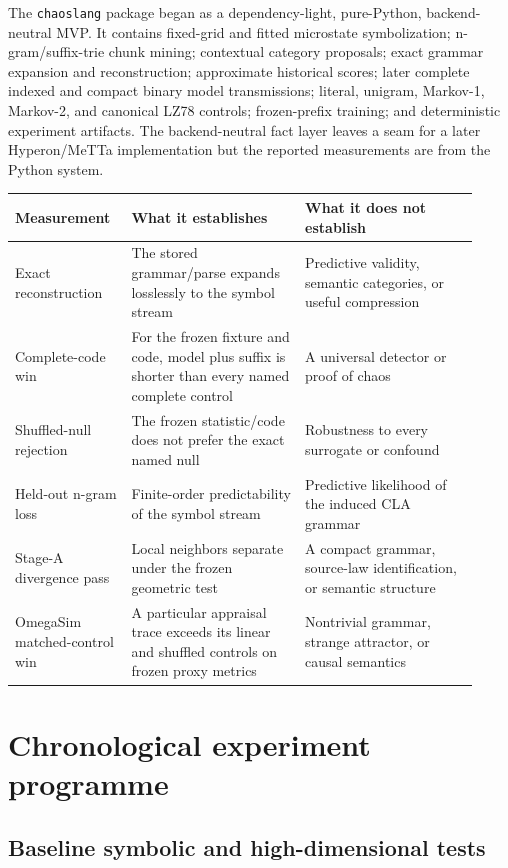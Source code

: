 \documentclass[10pt]{article}
\begin{document}
The \texttt{chaoslang} package began as a dependency-light, pure-Python,
backend-neutral MVP. It contains fixed-grid and fitted microstate
symbolization; n-gram/suffix-trie chunk mining; contextual category proposals;
exact grammar expansion and reconstruction; approximate historical scores;
later complete indexed and compact binary model transmissions; literal,
unigram, Markov-1, Markov-2, and canonical LZ78 controls; frozen-prefix
training; and deterministic experiment artifacts. The backend-neutral fact
layer leaves a seam for a later Hyperon/MeTTa implementation but the reported
measurements are from the Python system.

\begin{longtable}{p{0.22\linewidth}p{0.35\linewidth}p{0.35\linewidth}}
\toprule
Measurement & What it establishes & What it does not establish \\
\midrule
\endhead
Exact reconstruction & The stored grammar/parse expands losslessly to the
symbol stream & Predictive validity, semantic categories, or useful
compression \\
Complete-code win & For the frozen fixture and code, model plus suffix is
shorter than every named complete control & A universal detector or proof of
chaos \\
Shuffled-null rejection & The frozen statistic/code does not prefer the exact
named null & Robustness to every surrogate or confound \\
Held-out n-gram loss & Finite-order predictability of the symbol stream &
Predictive likelihood of the induced CLA grammar \\
Stage-A divergence pass & Local neighbors separate under the frozen geometric
test & A compact grammar, source-law identification, or semantic structure \\
OmegaSim matched-control win & A particular appraisal trace exceeds its
linear and shuffled controls on frozen proxy metrics & Nontrivial grammar,
strange attractor, or causal semantics \\
\bottomrule
\end{longtable}

\section{Chronological experiment programme}

\subsection{Baseline symbolic and high-dimensional tests}
\end{document}
